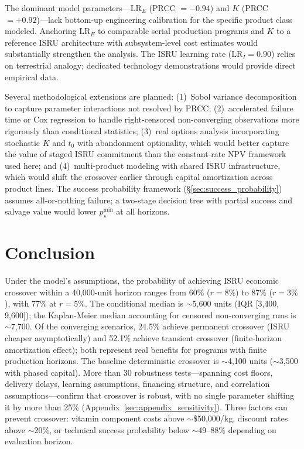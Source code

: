 \documentclass[preprint,12pt]{elsarticle}
\begin{document}
The dominant model parameters---LR$_E$ (PRCC $= -0.94$) and $K$ (PRCC $= +0.92$)---lack bottom-up engineering calibration for the specific product class modeled. Anchoring LR$_E$ to comparable serial production programs and $K$ to a reference ISRU architecture with subsystem-level cost estimates would substantially strengthen the analysis. The ISRU learning rate ($\mathrm{LR}_I = 0.90$) relies on terrestrial analogy; dedicated technology demonstrations would provide direct empirical data.

Several methodological extensions are planned: (1)~Sobol variance decomposition to capture parameter interactions not resolved by PRCC; (2)~accelerated failure time or Cox regression to handle right-censored non-converging observations more rigorously than conditional statistics; (3)~real options analysis incorporating stochastic $K$ and $t_0$ with abandonment optionality, which would better capture the value of staged ISRU commitment than the constant-rate NPV framework used here; and (4)~multi-product modeling with shared ISRU infrastructure, which would shift the crossover earlier through capital amortization across product lines. The success probability framework (\S\ref{sec:success_probability}) assumes all-or-nothing failure; a two-stage decision tree with partial success and salvage value would lower $p_s^{\min}$ at all horizons.

\section{Conclusion}
\label{sec:conclusion}

Under the model's assumptions, the probability of achieving ISRU economic crossover within a 40{,}000-unit horizon ranges from 60\% ($r = 8\%$) to 87\% ($r = 3\%$), with 77\% at $r = 5\%$. The conditional median is $\sim$5{,}600 units (IQR [3{,}400, 9{,}600]); the Kaplan-Meier median accounting for censored non-converging runs is $\sim$7{,}700. Of the converging scenarios, 24.5\% achieve permanent crossover (ISRU cheaper asymptotically) and 52.1\% achieve transient crossover (finite-horizon amortization effect); both represent real benefits for programs with finite production horizons. The baseline deterministic crossover is $\sim$4{,}100 units ($\sim$3{,}500 with phased capital). More than 30 robustness tests---spanning cost floors, delivery delays, learning assumptions, financing structure, and correlation assumptions---confirm that crossover is robust, with no single parameter shifting it by more than 25\% (Appendix~\ref{sec:appendix_sensitivity}). Three factors can prevent crossover: vitamin component costs above $\sim$\$50{,}000/kg, discount rates above $\sim$20\%, or technical success probability below $\sim$49--88\% depending on evaluation horizon.
\end{document}
